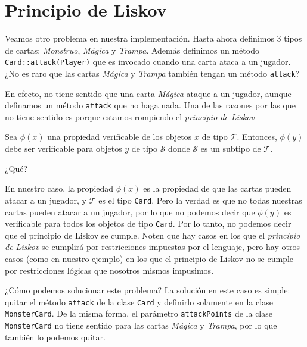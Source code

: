 \section{Principio de Liskov}
  \label{sec:principio-de-liskov}

  Veamos otro problema en nuestra implementación.
  Hasta ahora definimos 3 tipos de cartas: \textit{Monstruo}, \textit{Mágica} y \textit{Trampa}.
  Además definimos un método \texttt{Card::attack(Player)} que es invocado cuando una carta ataca a 
  un jugador.
  ¿No es raro que las cartas \textit{Mágica} y \textit{Trampa} también tengan un método 
  \texttt{attack}?

  En efecto, no tiene sentido que una carta \textit{Mágica} ataque a un jugador, aunque definamos
  un método \texttt{attack} que no haga nada.
  Una de las razones por las que no tiene sentido es porque estamos rompiendo el \textit{principio
  de Liskov}

  \begin{defaultbox}
    Sea \(\phi(x)\) una propiedad verificable de los objetos \(x\) de tipo \(\mathcal{T}\).
    Entonces, \(\phi(y)\) debe ser verificable para objetos \(y\) de tipo \(\mathcal{S}\) donde
    \(\mathcal{S}\) es un subtipo de \(\mathcal{T}\).
  \end{defaultbox}

  \begin{center}
    ¿Qué?
  \end{center}

  En nuestro caso, la propiedad \(\phi(x)\) es la propiedad de que las cartas pueden atacar a un
  jugador, y \(\mathcal{T}\) es el tipo \texttt{Card}.
  Pero la verdad es que no todas nuestras cartas pueden atacar a un jugador, por lo que no podemos
  decir que \(\phi(y)\) es verificable para todos los objetos de tipo \texttt{Card}.
  Por lo tanto, no podemos decir que el principio de Liskov se cumple.
  Noten que hay casos en los que el \textit{principio de Liskov} se cumplirá por restricciones
  impuestas por el lenguaje, pero hay otros casos (como en nuestro ejemplo) en los que el principio
  de Liskov no se cumple por restricciones lógicas que nosotros mismos impusimos.

  ¿Cómo podemos solucionar este problema?
  La solución en este caso es simple: quitar el método \texttt{attack} de la clase \texttt{Card} y
  definirlo solamente en la clase \texttt{MonsterCard}.
  De la misma forma, el parámetro \texttt{attackPoints} de la clase \texttt{MonsterCard} no tiene
  sentido para las cartas \textit{Mágica} y \textit{Trampa}, por lo que también lo podemos quitar.

